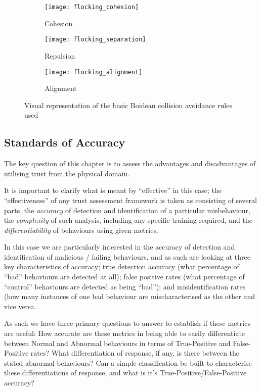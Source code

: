 \begin{figure*}
  \centering
  \begin{subfigure}[t]{0.3\textwidth}
    \centering
    \texttt{[image: flocking\_cohesion]}
    \caption{Cohesion}
  \end{subfigure}
  \begin{subfigure}[t]{0.3\textwidth}
    \centering
    \texttt{[image: flocking\_separation]}
    \caption{Repulsion}
  \end{subfigure}
  \begin{subfigure}[t]{0.3\textwidth}
    \centering
    \texttt{[image: flocking\_alignment]}
    \caption{Alignment}
  \end{subfigure}
  \caption{Visual representation of the basic Boidean collision avoidance rules used}
  \label{fig:boids}
\end{figure*}


\subsection{Standards of Accuracy}\label{sec:standards}

The key question of this chapter is to assess the advantages and disadvantages of utilising trust from the physical domain. 

It is important to clarify what is meant by ``effective'' in this case; the ``effectiveness'' of any trust assessment framework is taken as consisting of several parts, the \emph{accuracy} of detection and identification of a particular misbehaviour, the \emph{complexity} of such analysis, including any specific training required, and the \emph{differentiability} of behaviours using given metrics.

In this case we are particularly interested in the accuracy of detection and identification of malicious / failing behaviours, and as such are looking at three key characteristics of accuracy; true detection accuracy (what percentage of ``bad'' behaviours are detected at all); false positive rates (what percentage of ``control'' behaviours are detected as being ``bad''); and misidentification rates (how many instances of one bad behaviour are mischaracterised as the other and vice versa.

As such we have three primary questions to answer to establish if these metrics are useful: 
How accurate are these metrics in being able to easily differentiate between Normal and Abnormal behaviours in terms of True-Positive and False-Positive rates?
What differentiation of response, if any, is there between the stated abnormal behaviours?
Can a simple classification be built to characterise these differentiations of response, and what is it's True-Positive/False-Positive accuracy?


